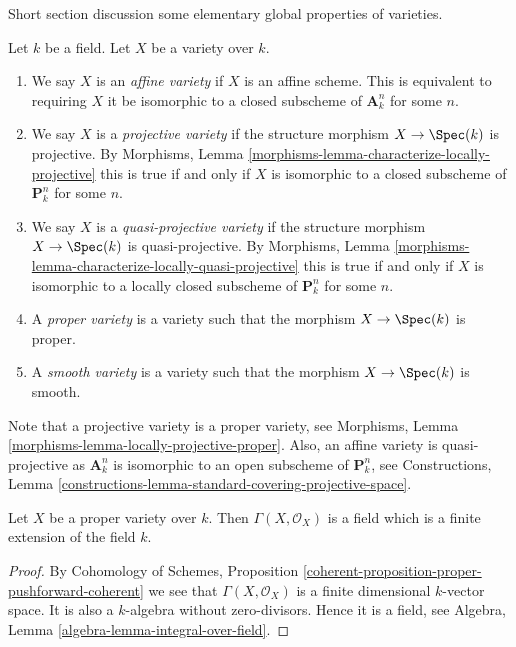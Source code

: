 \noindent
Short section discussion some elementary global properties of varieties.

\begin{definition}
\label{definition-variety-type}
Let $k$ be a field. Let $X$ be a variety over $k$.
\begin{enumerate}
\item We say $X$ is an {\it affine variety} if $X$ is an affine scheme.
This is equivalent to requiring $X$ it be isomorphic to a closed
subscheme of $\mathbf{A}^n_k$ for some $n$.
\item We say $X$ is a {\it projective variety} if the
structure morphism $X \to \Spec(k)$ is projective. By
Morphisms, Lemma \ref{morphisms-lemma-characterize-locally-projective}
this is true if and only if $X$ is isomorphic to a closed
subscheme of $\mathbf{P}^n_k$ for some $n$.
\item We say $X$ is a {\it quasi-projective variety} if
the structure morphism $X \to \Spec(k)$ is quasi-projective. By
Morphisms, Lemma \ref{morphisms-lemma-characterize-locally-quasi-projective}
this is true if and only if $X$ is isomorphic to a
locally closed subscheme of $\mathbf{P}^n_k$ for some $n$.
\item A {\it proper variety} is a variety such that the
morphism $X \to \Spec(k)$ is proper.
\item A {\it smooth variety} is a variety such that the
morphism $X \to \Spec(k)$ is smooth.
\end{enumerate}
\end{definition}

\noindent
Note that a projective variety is a proper variety, see
Morphisms, Lemma \ref{morphisms-lemma-locally-projective-proper}.
Also, an affine variety is quasi-projective as $\mathbf{A}^n_k$
is isomorphic to an open subscheme of $\mathbf{P}^n_k$, see
Constructions,
Lemma \ref{constructions-lemma-standard-covering-projective-space}.

\begin{lemma}
\label{lemma-regular-functions-proper-variety}
Let $X$ be a proper variety over $k$.
Then $\Gamma(X, \mathcal{O}_X)$ is a field which is
a finite extension of the field $k$.
\end{lemma}

\begin{proof}
By Cohomology of Schemes, Proposition
\ref{coherent-proposition-proper-pushforward-coherent}
we see that $\Gamma(X, \mathcal{O}_X)$ is a finite dimensional
$k$-vector space. It is also a $k$-algebra without zero-divisors.
Hence it is a field, see
Algebra, Lemma \ref{algebra-lemma-integral-over-field}.
\end{proof}




